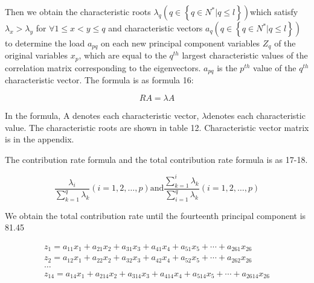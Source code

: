 Then we obtain the characteristic roots $\lambda _ { q } \left( q \in \left\{ q \in N ^ { * } | q \leq l \right\} \right)$which satisfy $\lambda _ { x } > \lambda _ { y }$ for $\forall 1 \leq x < y \leq q$ and characteristic vectors $a _ { q } \left( q \in \left\{ q \in N ^ { * } | q \leq l \right\} \right)$ to determine the load $a _ { p q }$ on each new principal component variables $Z _ { q }$ of the original variables $x _ { p }$, which are equal to the $q ^ { t h }$ largest characteristic values of the correlation matrix corresponding to the eigenvectors.  $a _ { p q }$ is the $p ^ { t h }$ value of the $q ^ { t h }$ characteristic vector. The formula is as formula 16: 

\begin{equation}
R A = \lambda A
\end{equation}

In the formula, A denotes each characteristic vector, $\lambda$denotes each characteristic value. The characteristic roots are shown in table 12. Characteristic vector matrix is in the appendix. 

The contribution rate formula and the total contribution rate formula is as 17-18. 

\begin{equation}
\frac { \lambda _ { i } } { \sum _ { k = 1 } ^ { q } \lambda _ { k } }( i = 1,2 , \dots , p )\text{and}\frac { \sum _ { k = 1 } ^ { i } \lambda _ { k } } { \sum _ { i = 1 } ^ { q } \lambda _ { k } }( i = 1,2 , \dots , p )
\end{equation}

We obtain the total contribution rate until the fourteenth principal component is 81.45%

\begin{equation}
\begin{array} { l } { z _ { 1 } = a _ { 11 } x _ { 1 } + a _ { 21 } x _ { 2 } + a _ { 31 } x _ { 3 } + a _ { 41 } x _ { 4 } + a _ { 51 } x _ { 5 } + \cdots + a _ { 261 } x _ { 26 } } \\ { z _ { 2 } = a _ { 12 } x _ { 1 } + a _ { 22 } x _ { 2 } + a _ { 32 } x _ { 3 } + a _ { 42 } x _ { 4 } + a _ { 52 } x _ { 5 } + \cdots + a _ { 262 } x _ { 26 } } \\ { \dots } \\ { z _ { 14 } = a _ { 14 } x _ { 1 } + a _ { 214 } x _ { 2 } + a _ { 314 } x _ { 3 } + a _ { 414 } x _ { 4 } + a _ { 514 } x _ { 5 } + \cdots + a _ { 2614 } x _ { 26 } } \end{array}
\end{equation}

